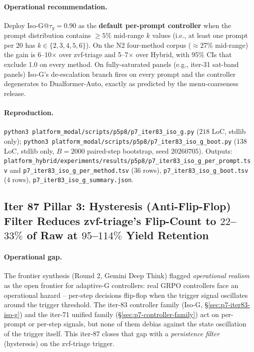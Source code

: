 \documentclass{article}
\begin{document}
\paragraph{Operational recommendation.}
Deploy Iso-G@$\tau_y{=}0.90$ as the \textbf{default per-prompt
controller} when the prompt distribution contains $\ge 5\%$
mid-range $k$ values (i.e., at least one prompt per 20 has
$k \in \{2,3,4,5,6\}$).  On the N2 four-method corpus
($\approx$27\% mid-range) the gain is 6--10$\times$ over
zvf-triage and 5--7$\times$ over Hybrid, with 95\% CIs that
exclude 1.0 on every method.  On fully-saturated panels
(e.g., iter-31 sat-band panels) Iso-G's de-escalation branch
fires on every prompt and the controller degenerates to
Dualformer-Auto, exactly as predicted by the menu-coarseness
release.

\paragraph{Reproduction.}
\texttt{python3 platform\_modal/scripts/p5p8/p7\_iter83\_iso\_g.py} ($218$ LoC,
stdlib only); \texttt{python3 platform\_modal/scripts/p5p8/p7\_iter83\_iso\_g_boot.py}
($138$ LoC, stdlib only, $B{=}2000$ paired-step bootstrap,
seed $20260705$).  Outputs:
\texttt{platform\_hybrid/experiments/results/p5p8/p7\_iter83\_iso\_g\_per\_prompt.tsv}
and \texttt{p7\_iter83\_iso\_g\_per\_method.tsv}
($36$ rows), \texttt{p7\_iter83\_iso\_g\_boot.tsv} ($4$ rows),
\texttt{p7\_iter83\_iso\_g\_summary.json}. \subsection{Iter 87 Pillar 3: Hysteresis (Anti-Flip-Flop) Filter
              Reduces zvf-triage's Flip-Count to $22$--$33\%$ of Raw
              at $95$--$114\%$ Yield Retention}
\label{sec:p7-iter87-hysteresis}

\paragraph{Operational gap.}
The frontier synthesis (Round 2, Gemini Deep Think) flagged
\emph{operational realism} as the open frontier for adaptive-G
controllers: real GRPO controllers face an operational hazard --
per-step decisions flip-flop when the trigger signal oscillates
around the trigger threshold.  The iter-83 controller family
(Iso-G, \S\ref{sec:p7-iter83-iso-g}) and the iter-71 unified
family (\S\ref{sec:p7-controller-family}) act on per-prompt or
per-step signals, but none of them debias against the state
oscillation of the trigger itself.  This iter-87 closes that gap
with a \emph{persistence filter} (hysteresis) on the zvf-triage
trigger.
\end{document}
